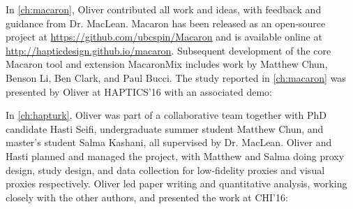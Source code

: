 
\noindent
In \autoref{ch:macaron}, Oliver contributed all work and ideas, with feedback and guidance from Dr. MacLean.
Macaron has been released as an open-source project at \url{https://github.com/ubcspin/Macaron} and is available online at \url{http://hapticdesign.github.io/macaron}.
Subsequent development of the core Macaron tool and extension MacaronMix includes work by Matthew Chun, Benson Li, Ben Clark, and Paul Bucci.
The study reported in \autoref{ch:macaron} was presented by Oliver at HAPTICS'16 with an associated demo: 



\noindent
In \autoref{ch:hapturk}, Oliver was part of a collaborative team together with PhD candidate Hasti Seifi, undergraduate summer student Matthew Chun, and master's student Salma Kashani, all supervised by Dr. MacLean.
Oliver and Hasti planned and managed the project, with Matthew and Salma doing proxy design, study design, and data collection for low-fidelity proxies and visual proxies respectively.
Oliver led paper writing and quantitative analysis, working closely with the other authors, and presented the work at CHI'16:


